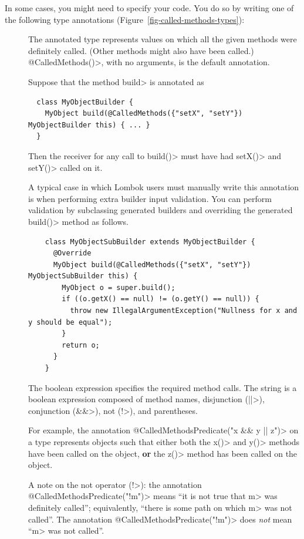 In some cases, you might need to specify your code. You do so by writing one of the following type
annotations (Figure~\ref{fig-called-methods-types}):
\begin{description}
\item[]
  The annotated type represents values on which all the given methods were definitely called.
  (Other methods might also have been called.) \<@CalledMethods()>, with no
  arguments, is the default annotation.

  Suppose that the method \<build> is annotated as

  \begin{Verbatim}
  class MyObjectBuilder {
    MyObject build(@CalledMethods({"setX", "setY"}) MyObjectBuilder this) { ... }
  }
  \end{Verbatim}

  Then the receiver for any call to \<build()> must have had \<setX()> and \<setY()> called on it.

  A typical case in which Lombok users must manually write this annotation is when performing extra
  builder input validation. You can perform validation by subclassing generated builders
  and overriding the generated \<build()> method as follows.

  \begin{Verbatim}
    class MyObjectSubBuilder extends MyObjectBuilder {
      @Override
      MyObject build(@CalledMethods({"setX", "setY"}) MyObjectSubBuilder this) {
        MyObject o = super.build();
        if ((o.getX() == null) != (o.getY() == null)) {
          throw new IllegalArgumentException("Nullness for x and y should be equal");
        }
        return o;
      }
    }
  \end{Verbatim}

\item[]
  The boolean expression specifies the required method calls.  The string
  is a boolean expression composed of method names, disjunction (\<||>),
  conjunction (\<\&\&>), not (\<!>), and parentheses.

  For example, the annotation \<@CalledMethodsPredicate("x \&\& y || z")> on a type represents
  objects such that either both the \<x()> and \<y()> methods have been called on the object, \textbf{or}
  the \<z()> method has been called on the object.

  A note on the not operator (\<!>): the annotation
  \<@CalledMethodsPredicate("!m")> means ``it is not true that \<m> was
  definitely called''; equivalently, ``there is some path on which \<m> was
  not called''.  The annotation \<@CalledMethodsPredicate("!m")> does
  \emph{not} mean ``\<m> was not called''.


\end{description}
